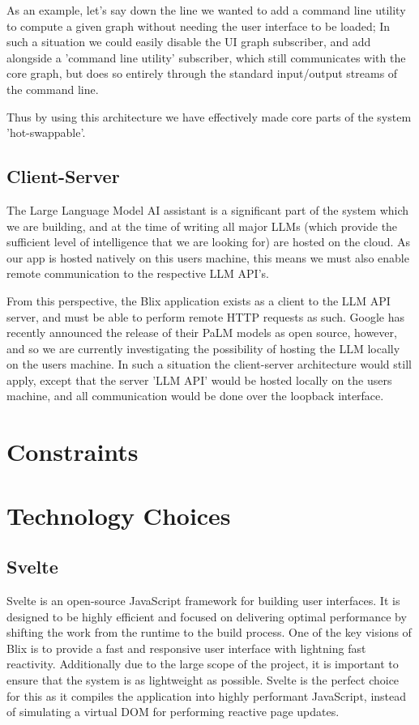 \documentclass[11pt,a4paper]{article}
\begin{document}
As an example, let's say down the line we wanted to add a command line utility
to compute a given graph without needing the user interface to be loaded; In
such a situation we could easily disable the UI graph subscriber, and add
alongside a 'command line utility' subscriber, which still communicates with the
core graph, but does so entirely through the standard input/output streams of
the command line.

Thus by using this architecture we have effectively made core parts of the
system 'hot-swappable'.

\subsection{Client-Server}
The Large Language Model AI assistant is a significant part of the system which
we are building, and at the time of writing all major LLMs (which provide the
sufficient level of intelligence that we are looking for) are hosted on the
cloud. As our app is hosted natively on this users machine, this means we must
also enable remote communication to the respective LLM API's.

From this perspective, the Blix application exists as a client to the LLM API
server, and must be able to perform remote HTTP requests as such. Google has
recently announced the release of their PaLM models as open source, however, and
so we are currently investigating the possibility of hosting the LLM locally on
the users machine. In such a situation the client-server architecture would
still apply, except that the server 'LLM API' would be hosted locally on the
users machine, and all communication would be done over the loopback interface.

\section{Constraints}


\section{Technology Choices}

\subsection{Svelte}
Svelte is an open-source JavaScript framework for building user interfaces. It
is designed to be highly efficient and focused on delivering optimal performance
by shifting the work from the runtime to the build process. One of the key
visions of Blix is to provide a fast and responsive user interface with
lightning fast reactivity. Additionally due to the large scope of the project,
it is important to ensure that the system is as lightweight as possible. Svelte
is the perfect choice for this as it compiles the application into highly performant JavaScript, instead of simulating a virtual DOM for performing reactive page updates.
\end{document}
